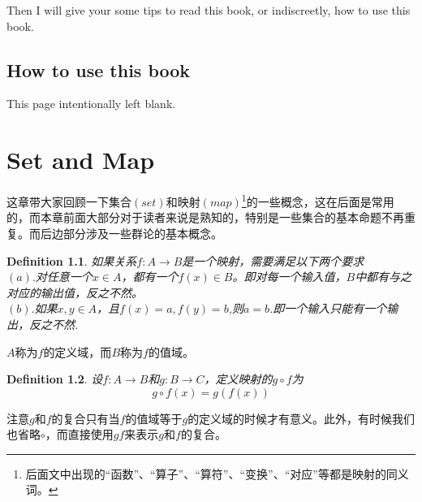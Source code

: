 \documentclass[11pt,a4paper,openany]{book}%
\theoremstyle{plain}%
\newtheorem{defi}{Definition}[chapter]%
\begin{document}
Then I will give your some tips to read this book, or indiscreetly, how to use this book.

\section*{How to use this book}
\tableofcontents
\clearpage
\thispagestyle{empty}
\begin{center}
This page intentionally left blank.
\end{center}
\mainmatter
\chapter{Set and Map}
这章带大家回顾一下集合$(set)$和映射$(map)$\footnote{后面文中出现的“函数”、“算子”、“算符”、“变换”、“对应”等都是映射的同义词。}的一些概念，这在后面是常用的，而本章前面大部分对于读者来说是熟知的，特别是一些集合的基本命题不再重复。而后边部分涉及一些群论的基本概念。

\begin{defi}
\label{1.1}
如果关系$f:A\rightarrow B$是一个映射，需要满足以下两个要求\\
$(a).$对任意一个$x\in A$，都有一个$f(x)\in B$。即对每一个输入值，$B$中都有与之对应的输出值，反之不然。\\
$(b).$如果$x,y\in A$，且$f(x)=a,f(y)=b$,则$a=b$.即一个输入只能有一个输出，反之不然.
\end{defi}
$A$称为$f$的定义域，而$B$称为$f$的值域。
\begin{defi}
设$f:A\rightarrow B$和$g:B\rightarrow C$，定义映射的$g\circ f$为
\[
g\circ f(x)=g(f(x))
\]
\end{defi}
注意$g$和$f$的复合只有当$f$的值域等于$g$的定义域的时候才有意义。此外，有时候我们也省略$\circ$，而直接使用$gf$来表示$g$和$f$的复合。
\end{document}
